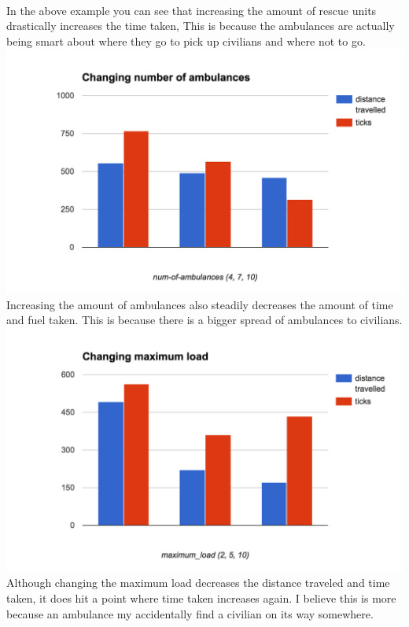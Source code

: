 \documentclass[titlepage]{article}
\begin{document}
    \\
    In the above example you can see that increasing the amount of rescue units drastically increases the time taken, This is because the ambulances are actually being smart about where they go to pick up civilians and where not to go.
    \\
    \includegraphics[width=\textwidth,height=\textheight,keepaspectratio]{2ambs.png}
    \\
    Increasing the amount of ambulances also steadily decreases the amount of time and fuel taken. This is because there is a bigger spread of ambulances to civilians.
    \\
    \includegraphics[width=\textwidth,height=\textheight,keepaspectratio]{2load.png}
    \\
    Although changing the maximum load decreases the distance traveled and time taken, it does hit a point where time taken increases again. I believe this is more because an ambulance my accidentally find a civilian on its way somewhere.
\end{document}
